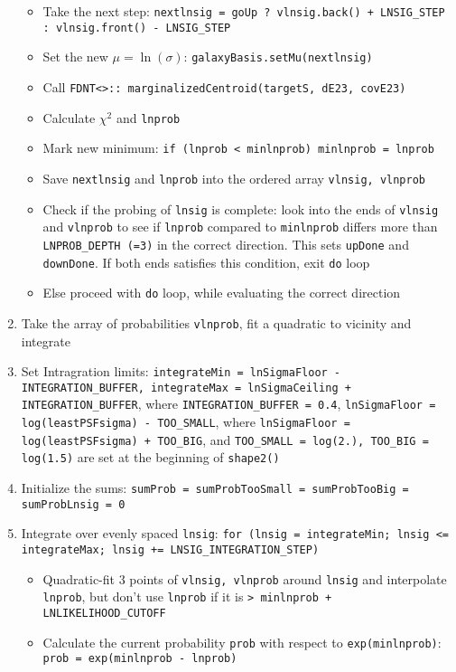 \documentclass[useAMS,usenatbib,usegraphicx]{mn2e}
\begin{document}
\begin{enumerate}
\begin{itemize}
  \item Take the next step: {\tt nextlnsig = goUp ? vlnsig.back() + LNSIG\_STEP : 
    vlnsig.front() - LNSIG\_STEP}
  \item Set the new $\mu =\ln(\sigma)$: {\tt galaxyBasis.setMu(nextlnsig)}
  \item Call {\tt FDNT<>:: marginalizedCentroid(targetS, dE23, covE23)}
  \item Calculate $\chi^2$ and {\tt lnprob}
  \item Mark new minimum: {\tt if (lnprob < minlnprob) minlnprob = lnprob}
  \item Save {\tt nextlnsig} and {\tt lnprob} into the ordered array {\tt vlnsig, vlnprob}
  \item Check if the probing of {\tt lnsig} is complete: look into the ends of {\tt vlnsig} and 
    {\tt vlnprob} to see if {\tt lnprob} compared to {\tt minlnprob} differs more than 
    {\tt LNPROB\_DEPTH (=3)} in the correct direction.  This sets {\tt upDone} and {\tt downDone}.
    If both ends satisfies this condition, exit {\tt do} loop
  \item Else proceed with {\tt do} loop, while evaluating the correct direction
  \end{itemize}
\item Take the array of probabilities {\tt vlnprob}, fit a quadratic to vicinity and integrate
\item Set Intragration limits: {\tt integrateMin = lnSigmaFloor - INTEGRATION\_BUFFER,
  integrateMax = lnSigmaCeiling + INTEGRATION\_BUFFER}, where {\tt INTEGRATION\_BUFFER = 0.4},
  {\tt lnSigmaFloor = log(leastPSFsigma) - TOO\_SMALL}, where {\tt lnSigmaFloor = log(leastPSFsigma) 
  + TOO\_BIG}, and {\tt TOO\_SMALL = log(2.), TOO\_BIG = log(1.5)} are set at the beginning of
  {\tt shape2()}
\item Initialize the sums: {\tt sumProb = sumProbTooSmall = sumProbTooBig = sumProbLnsig = 0}
\item Integrate over evenly spaced {\tt lnsig}:
  {\tt for (lnsig = integrateMin; lnsig <= integrateMax; lnsig += LNSIG\_INTEGRATION\_STEP)}
  \begin{itemize}
  \item Quadratic-fit 3 points of {\tt vlnsig, vlnprob} around {\tt lnsig} and interpolate 
    {\tt lnprob}, but don't use {\tt lnprob} if it is {\tt > minlnprob + LNLIKELIHOOD\_CUTOFF}
  \item Calculate the current probability {\tt prob} with respect to {\tt exp(minlnprob)}:
    {\tt prob = exp(minlnprob - lnprob)}

\end{itemize}
\end{enumerate}
\end{document}
